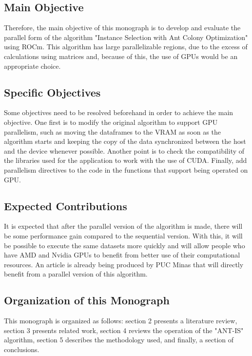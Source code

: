 \subsection{Main Objective}

Therefore, the main objective of this monograph is to develop and evaluate the parallel form of the algorithm "Instance Selection with Ant Colony Optimization" using ROCm. This algorithm has large parallelizable regions, due to the excess of calculations using matrices and, because of this, the use of GPUs would be an appropriate choice.

\subsection{Specific Objectives}

Some objectives need to be resolved beforehand in order to achieve the main objective. One first is to modify the original algorithm to support GPU parallelism, such as moving the dataframes to the VRAM as soon as the algorithm starts and keeping the copy of the data synchronized between the host and the device whenever possible. Another point is to check the compatibility of the libraries used for the application to work with the use of CUDA. Finally, add parallelism directives to the code in the functions that support being operated on GPU.

\subsection{Expected Contributions}

It is expected that after the parallel version of the algorithm is made, there will be some performance gain compared to the sequential version. With this, it will be possible to execute the same datasets more quickly and will allow people who have AMD and Nvidia GPUs to benefit from better use of their computational resources. An article is already being produced by PUC Minas that will directly benefit from a parallel version of this algorithm.

\subsection{Organization of this Monograph}

This monograph is organized as follows: section 2 presents a literature review, section 3 presents related work, section 4 reviews the operation of the "ANT-IS" algorithm, section 5 describes the methodology used, and finally, a section of conclusions.
